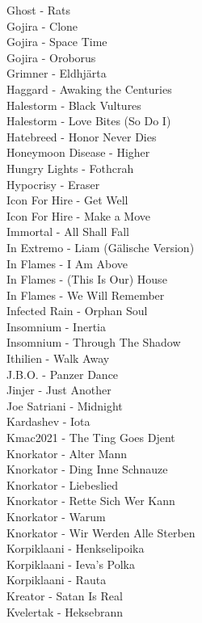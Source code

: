 Ghost - Rats\\
Gojira - Clone\\
Gojira - Space Time\\
Gojira - Oroborus\\
Grimner - Eldhjärta\\
Haggard - Awaking the Centuries\\
Halestorm - Black Vultures\\
Halestorm - Love Bites (So Do I)\\
Hatebreed - Honor Never Dies\\
Honeymoon Disease - Higher\\
Hungry Lights - Fothcrah\\
Hypocrisy - Eraser\\
Icon For Hire - Get Well\\
Icon For Hire - Make a Move\\
Immortal - All Shall Fall\\
In Extremo - Liam (Gälische Version)\\
In Flames - I Am Above\\
In Flames - (This Is Our) House\\
In Flames - We Will Remember\\
Infected Rain - Orphan Soul\\
Insomnium - Inertia\\
Insomnium - Through The Shadow\\
Ithilien - Walk Away\\
J.B.O. - Panzer Dance\\
Jinjer - Just Another\\
Joe Satriani - Midnight\\
Kardashev - Iota\\
Kmac2021 - The Ting Goes Djent\\
Knorkator - Alter Mann\\
Knorkator - Ding Inne Schnauze\\
Knorkator - Liebeslied\\
Knorkator - Rette Sich Wer Kann\\
Knorkator - Warum\\
Knorkator - Wir Werden Alle Sterben\\
Korpiklaani - Henkselipoika\\
Korpiklaani - Ieva's Polka\\
Korpiklaani - Rauta\\
Kreator - Satan Is Real\\
Kvelertak - Heksebrann\\
